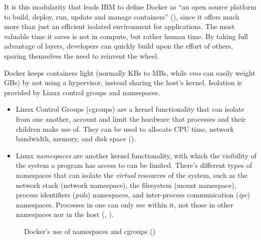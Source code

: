 \documentclass[11pt]{article}
\begin{document}
\begin{flushleft}
    It is this modularity that leads IBM to define Docker as  ``an open source platform to build, deploy, run, update and manage containers'' (\cite{ibmdocker}), since it offers much more than just an efficient isolated environment for applications. The most valuable time it saves is not in compute, but rather human time. By taking full advantage of layers, developers can quickly build upon the effort of others, sparing themselves the need to reinvent the wheel.
    \linebreak

    

    Docker keeps containers light (normally KBs to MBs, while \textit{\acrshort{vm}s} can easily weight GBs) by not using a hypervisor, instead sharing the host's kernel. Isolation is provided by Linux control groups and namespaces. 

        \begin{itemize}
            \itemsep0em 
            \item Linux Control Groups (cgroups) are a kernel functionality that can isolate from one another, account and limit the hardware that processes and their children make use of. They can be used to allocate CPU time, network bandwidth, memory, and disk space (\cite{linuxcgroups}). 

            \item Linux \textit{\gls{namespace}s} are another kernel functionality, with which the visibility of the system a program has access to can be limited. There's different types of namespaces that can isolate the \emph{virtual} resources of the system, such as the network stack (network namespace), the filesystem (mount namespace), process identifiers (\textit{\acrshort{pid}s}) namespaces, and inter-process communication (\textit{\acrshort{ipc}}) namespaces. Processes in one can only see within it, not those in other namespaces nor in the host (\cite{linuxnamespaces}, \cite{dockernscgroups}). 
        \end{itemize}
    

    \begin{figure}[htb]
		\centering
		\caption{Docker's use of namespaces and cgroups (\cite{dockerbikram})}
	\end{figure}


\end{flushleft}
\end{document}
